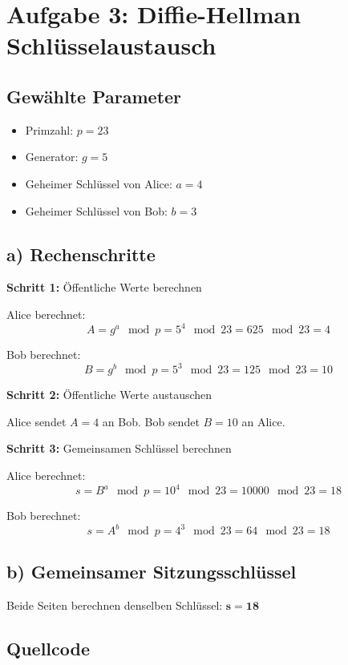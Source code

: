 \documentclass[
	fontsize=12pt,
	paper=a4,
	numbers=noenddot,
	listof=totoc,
	listof=entryprefix,
	listof=nochaptergap,
	bibliography=totoc,
	parskip=half,
	openany
]{scrbook}
\begin{document}
\chapter*{Aufgabe 3: Diffie-Hellman Schlüsselaustausch}

\section*{Gewählte Parameter}

\begin{itemize}
	\item Primzahl: $p = 23$
	\item Generator: $g = 5$
	\item Geheimer Schlüssel von Alice: $a = 4$
	\item Geheimer Schlüssel von Bob: $b = 3$
\end{itemize}

\section*{a) Rechenschritte}

\textbf{Schritt 1:} Öffentliche Werte berechnen

Alice berechnet:
\[ A = g^a \mod p = 5^4 \mod 23 = 625 \mod 23 = 4 \]

Bob berechnet:
\[ B = g^b \mod p = 5^3 \mod 23 = 125 \mod 23 = 10 \]

\textbf{Schritt 2:} Öffentliche Werte austauschen

Alice sendet $A = 4$ an Bob.
Bob sendet $B = 10$ an Alice.

\textbf{Schritt 3:} Gemeinsamen Schlüssel berechnen

Alice berechnet:
\[ s = B^a \mod p = 10^4 \mod 23 = 10000 \mod 23 = 18 \]

Bob berechnet:
\[ s = A^b \mod p = 4^3 \mod 23 = 64 \mod 23 = 18 \]

\section*{b) Gemeinsamer Sitzungsschlüssel}

Beide Seiten berechnen denselben Schlüssel: $\mathbf{s = 18}$

\section*{Quellcode}


\end{document}
